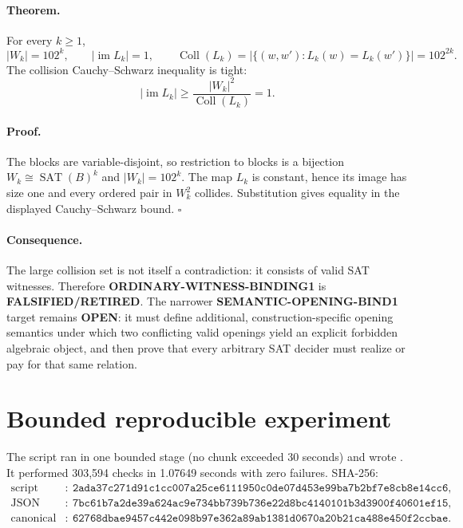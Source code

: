 \documentclass[11pt]{article}
\newcommand{\status}[1]{\textbf{#1}}
\begin{document}
\paragraph{Theorem.}
For every $k\geq1$,
\[
 |W_k|=102^k,
 \qquad |\operatorname{im}L_k|=1,
 \qquad \operatorname{Coll}(L_k)
 =|\{(w,w'):L_k(w)=L_k(w')\}|=102^{2k}.
\]
The collision Cauchy--Schwarz inequality is tight:
\[
 |\operatorname{im}L_k|
 \geq \frac{|W_k|^2}{\operatorname{Coll}(L_k)}=1.
\]

\paragraph{Proof.}
The blocks are variable-disjoint, so restriction to blocks is a bijection
$W_k\cong\operatorname{SAT}(B)^k$ and $|W_k|=102^k$.
The map $L_k$ is constant, hence its image has size one and every ordered
pair in $W_k^2$ collides.  Substitution gives equality in the displayed
Cauchy--Schwarz bound. \hfill$\square$

\paragraph{Consequence.}
The large collision set is not itself a contradiction: it consists of valid
SAT witnesses.  Therefore \status{ORDINARY-WITNESS-BINDING1} is
\status{FALSIFIED/RETIRED}.  The narrower
\status{SEMANTIC-OPENING-BIND1} target remains \status{OPEN}: it must define
additional, construction-specific opening semantics under which two
conflicting valid openings yield an explicit forbidden algebraic object, and
then prove that every arbitrary SAT decider must realize or pay for that same
relation.

\section*{Bounded reproducible experiment}

The script
 ran in one bounded
stage (no chunk exceeded 30 seconds) and wrote
.
It performed 303,594 checks in 1.07649 seconds with zero failures.  SHA-256:
\begin{align*}
\text{script}&:\ \texttt{2ada37c271d91c1cc007a25ce6111950c0de07d453e99ba7b2bf7e8cb8e14cc6},\\
\text{JSON file}&:\ \texttt{7bc61b7a2de39a624ac9e734bb739b736e22d8bc4140101b3d3900f40601ef15},\\
\text{canonical payload}&:\ \texttt{62768dbae9457c442e098b97e362a89ab1381d0670a20b21ca488e450f2ccbae}.
\end{align*}
\end{document}
